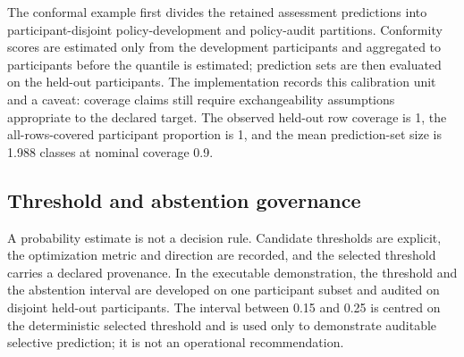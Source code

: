 The conformal example first divides the retained assessment predictions into participant-disjoint policy-development and policy-audit partitions. Conformity scores are estimated only from the development participants and aggregated to participants before the quantile is estimated; prediction sets are then evaluated on the held-out participants. The implementation records this calibration unit and a caveat: coverage claims still require exchangeability assumptions appropriate to the declared target. The observed held-out row coverage is 1, the all-rows-covered participant proportion is 1, and the mean prediction-set size is 1.988 classes at nominal coverage 0.9.

\begin{table}
\centering
\caption{\label{tab:conformal-summary-compact}Participant-disjoint conformal summary.}
\centering
{}
\end{table}

\subsection{Threshold and abstention governance}\label{threshold-and-abstention-governance}

A probability estimate is not a decision rule. Candidate thresholds are explicit, the optimization metric and direction are recorded, and the selected threshold carries a declared provenance. In the executable demonstration, the threshold and the abstention interval are developed on one participant subset and audited on disjoint held-out participants. The interval between 0.15 and 0.25 is centred on the deterministic selected threshold and is used only to demonstrate auditable selective prediction; it is not an operational recommendation.

\begin{table}
\centering
\caption{\label{tab:decision-rule-code}Governed decision-policy summary.}
\centering
{}
\end{table}

